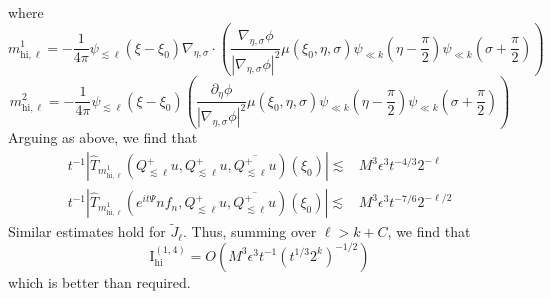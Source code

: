 \documentclass[letterpaper, reqno,final]{amsart}
\newcommand{\fhPi}{\frac{\pi}{2}}
\newcommand{\rmI}{\mathrm{I}}
\newcommand{\discrAvg}{\Psi}
\newcommand{\linProp}[1][t]{e^{i#1\discrAvg}}
\newcommand{\deles}{\nabla_{\eta,\sigma}}
\newcommand{\bigO}[1]{O\left({#1}\right)}
\begin{document}
where 
\begin{equation*}
    m^1_{\text{hi},\ell} = -\frac{1}{4\pi}\psi_{\lesssim \ell}(\xi - \xi_0)\deles \cdot \left(\frac{\deles \phi}{|\deles \phi|^2}\mu(\xi_0,\eta,\sigma) \psi_{\ll k}(\eta - \fhPi) \psi_{\ll k}(\sigma + \fhPi) \right)
\end{equation*}
\begin{equation*}
    m^2_{\text{hi},\ell} = -\frac{1}{4\pi}\psi_{\lesssim \ell}(\xi - \xi_0)\left(\frac{\partial_\eta \phi}{|\deles \phi|^2}\mu(\xi_0,\eta,\sigma) \psi_{\ll k}(\eta - \fhPi) \psi_{\ll k}(\sigma + \fhPi) \right)
\end{equation*}
Arguing as above, we find that
\begin{equation*}\begin{split}
    t^{-1}\left| \hat{T}_{m^1_{\text{hi},\ell}}(Q^+_{\lesssim \ell} u,Q^+_{\lesssim \ell} u, \overline{Q^+_{\lesssim \ell} u})(\xi_0)\right| %
    \lesssim& M^3\epsilon^3 t^{-4/3} 2^{-\ell}\\
    t^{-1}\left| \hat{T}_{m^1_{\text{hi},\ell}}(\linProp nf_n,Q^+_{\lesssim \ell} u, \overline{Q^+_{\lesssim \ell} u})(\xi_0)\right| %
    \lesssim& M^3\epsilon^3 t^{-7/6} 2^{-\ell/2}
\end{split}\end{equation*}
Similar estimates hold for $\tilde{J}_\ell$.  Thus, summing over $\ell > k + C$, we find that
\begin{equation*}
    \rmI^{(1,4)}_{\text{hi}} = \bigO{M^3\epsilon^3 t^{-1} (t^{1/3} 2^k)^{-1/2}}
\end{equation*}
which is better than required.
\end{document}
